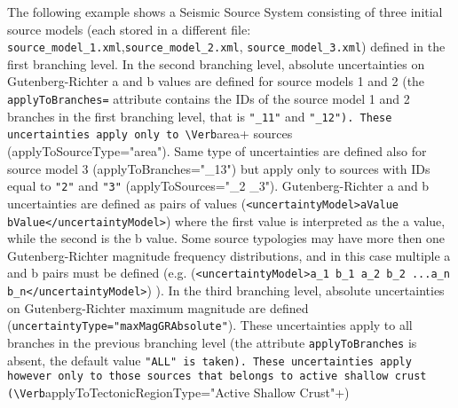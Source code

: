 The following example shows a Seismic Source System consisting of three initial source models (each stored in a different file: \Verb+source_model_1.xml+,\Verb+source_model_2.xml+, \Verb+source_model_3.xml+) defined in the first branching level. In the second branching level, absolute uncertainties on Gutenberg-Richter a and b values are defined for source models 1 and 2 (the  \Verb+applyToBranches=+ attribute contains the IDs of the source model 1 and 2 branches in the first branching level, that is \Verb+"_11"+ and \Verb+"_12"). These uncertainties apply only to \Verb+area+ sources (applyToSourceType="area"). Same type of uncertainties are defined also for source model 3 (applyToBranches="_13") but apply only to sources with IDs equal to \Verb+"2"+ and \Verb+"3"+ (applyToSources="_2 _3").  Gutenberg-Richter a and b uncertainties are defined as pairs of values (\Verb+<uncertaintyModel>aValue bValue</uncertaintyModel>+) where the first value is interpreted as the a value, while the second is the b value. Some source typologies may have more then one Gutenberg-Richter magnitude frequency distributions, and in this case multiple a and b pairs must be defined (e.g. (\Verb+<uncertaintyModel>a_1 b_1 a_2 b_2 ...a_n b_n</uncertaintyModel>+) ). In the third branching level, absolute uncertainties on Gutenberg-Richter maximum magnitude are defined (\Verb+uncertaintyType="maxMagGRAbsolute"+). These uncertainties apply to all branches in the previous branching level (the attribute \Verb+applyToBranches+ is absent, the default value \Verb+"ALL" is taken). These uncertainties apply however only to those sources that belongs to active shallow crust (\Verb+applyToTectonicRegionType="Active Shallow Crust"+)


